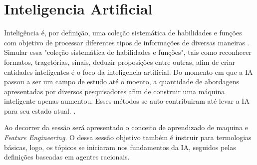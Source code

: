 \section{Inteligencia Artificial}

Inteligência é, por definição, uma coleção sistemática de habilidades e funções com objetivo de processar diferentes tipos de informações de diversas maneiras \cite[49]{guilford1982cognitive}. Simular essa "coleção sistemática de habilidades e funções", tais como reconhecer formatos, tragetórias, sinais, deduzir proposições entre outras, afim de criar entidades inteligentes é o foco da inteligencia artificial. Do momento em que a IA passou a ser um campo de estudo até o moento, a quantidade de abordagens apresentadas por diversos pesquisadores afim de construir uma máquina inteligente apenas aumentou. Esses métodos se auto-contribuiram até levar a IA para seu estado atual. \cite[1-2]{russell2003artificial}.

Ao decorrer da sessão será apresentado o conceito de aprendizado de maquina e \textit{Feature Engineering}. O dessa sessão objetivo também é instruir para termologias básicas, logo, os tópicos se iniciaram nos fundamentos da IA, seguidos pelas definições baseadas em agentes racionais.




